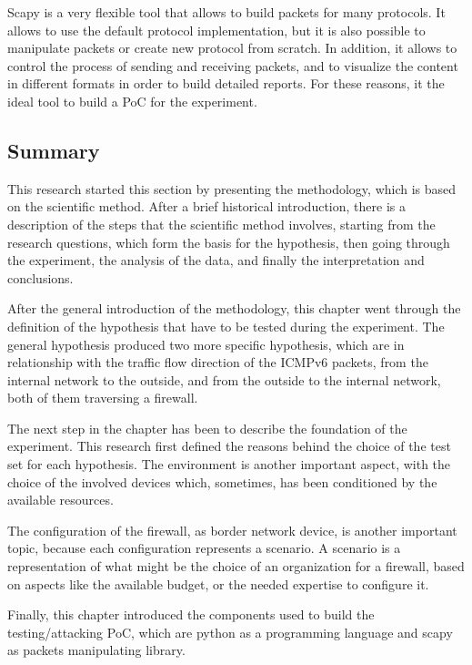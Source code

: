 \documentclass[12pt]{article}
\begin{document}
Scapy is a very flexible tool that allows to build packets for many protocols. It allows to use the default protocol implementation, but it is also possible to manipulate packets or create new protocol from scratch. In addition, it allows to control the process of sending and receiving packets, and to visualize the content in different formats in order to build detailed reports. For these reasons, it the ideal tool to build a PoC for the experiment.

\subsection{Summary}
\label{sub:methConclusions}

This research started this section by presenting the methodology, which is based on the scientific method. After a brief historical introduction, there is a description of the steps that the scientific method involves, starting from the research questions, which form the basis for the hypothesis, then going through the experiment, the analysis of the data, and finally the interpretation and conclusions.

After the general introduction of the methodology, this chapter went through the definition of the hypothesis that have to be tested during the experiment. The general hypothesis produced two more specific hypothesis, which are in relationship with the traffic flow direction of the ICMPv6 packets, from the internal network to the outside, and from the outside to the internal network, both of them traversing a firewall.

The next step in the chapter has been to describe the foundation of the experiment. This research first defined the reasons behind the choice of the test set for each hypothesis. The environment is another important aspect, with the choice of the involved devices which, sometimes, has been conditioned by the available resources.

The configuration of the firewall, as border network device, is another important topic, because each configuration represents a scenario. A scenario is a representation of what might be the choice of an organization for a firewall, based on aspects like the available budget, or the needed expertise to configure it.

Finally, this chapter introduced the components used to build the testing/attacking PoC, which are python as a programming language and scapy as packets manipulating library.
\end{document}
